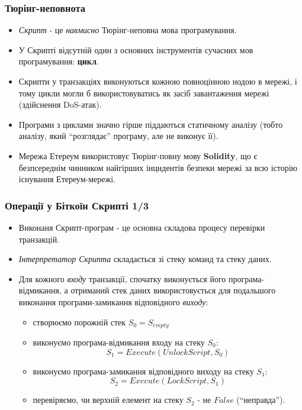 \documentclass{beamer}
\begin{document}
\begin{frame}[fragile]
  \frametitle{Тюрінг-неповнота}
  \begin{itemize}
  \item \textit{Скрипт} - це \textit{навмисно} Тюрінг-неповна мова
    програмування.
  \item У Скрипті відсутній один з основних інструментів сучасних мов
    програмування: \textbf{цикл}.
  \item Скрипти у транзакціях виконуються кожною повноцінною нодою в мережі, і
    тому цикли могли б використовуватись як засіб завантаження мережі
    (здійснення DoS-атак).
  \item Програми з циклами значно гірше піддаються статичному аналізу (тобто
    аналізу, який ``розглядає'' програму, але не виконує її).
  \item Мережа Етереум використовує Тюрінг-повну мову \textbf{Solidity}, що є
    безпсереднім чинником найгірших інцидентів безпеки мережі за всю історію
    існування Етереум-мережі.
  \end{itemize}
\end{frame}

\begin{frame}[fragile]
  \frametitle{Операції у Біткоїн Скрипті 1/3}
  \begin{itemize}
  \item Виконаня Скрипт-програм - це основна складова процесу перевірки транзакцій.
  \item \textit{Інтерпретатор Скрипта} складається зі стеку команд та стеку даних.
  \item Для кожного \textit{входу} транзакції, спочатку виконується його
    програма-відмикання, а отриманий стек даних використовується для подальшого
    виконання програми-замикання відповідного \textit{виходу}:
    \begin{itemize}
    \item створюємо порожній стек $S_0 = S_{empty}$
    \item виконуємо програма-відмикання входу на стеку $S_0$:
      $$S_1 = Execute(UnlockScript, S_0)$$
    \item виконуємо програма-замикання відповідного виходу на стеку $S_1$:
      $$S_2 = Execute(LockScript, S_1)$$
    \item перевіряємо, чи верхній елемент на стеку $S_2$ - не $False$
      (``неправда'').
    \end{itemize}
  \end{itemize}
\end{frame}
\end{document}
